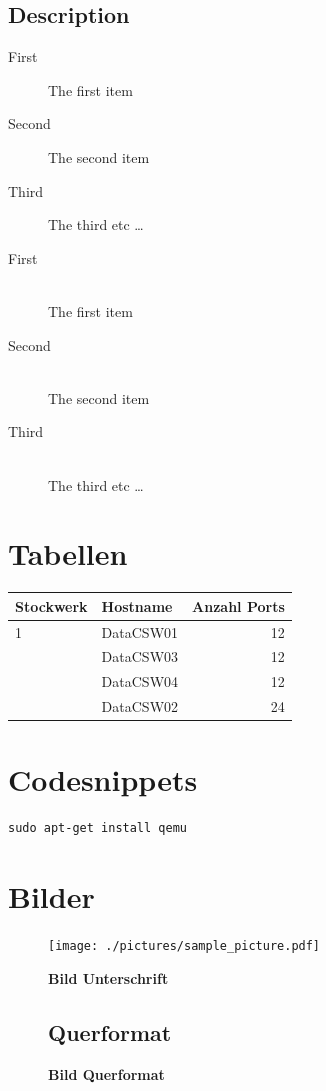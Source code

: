 \documentclass[a4,12pt]{scrartcl}
\begin{document}
\subsection{Description}
\begin{description}
  \item[First] The first item
  \item[Second] The second item
  \item[Third] The third etc \ldots
\end{description}
\begin{description}
  \item[First] \hfill \\
  The first item
  \item[Second] \hfill \\
  The second item
  \item[Third] \hfill \\
  The third etc \ldots
\end{description}

\section{Tabellen}
\begin{center}
    \begin{tabular}{@{} l l r@{}}\toprule    
    {Stockwerk} & {Hostname} & {Anzahl Ports}\\ \midrule
    1 & DataCSW01 & 12\\ \addlinespace
    & DataCSW03 & 12\\ \addlinespace
    & DataCSW04 & 12\\ \addlinespace
    2& DataCSW02 & 24\\
    \bottomrule
    \end{tabular}
\end{center}

\section{Codesnippets}
\begin{lstlisting}
sudo apt-get install qemu
\end{lstlisting}

\section{Bilder}
\begin{figure} [H]
	\begin{center}
	\texttt{[image: ./pictures/sample\_picture.pdf]}
	\caption{\textbf{Bild Unterschrift}}
	\label{Bild Referenz}
	\end{center}
\end{figure}

\begin{landscape}
\begin{figure}[htbp]
\subsection{Querformat}
\centering
{}
\caption{\textbf{Bild Querformat}}
\end{figure}
\end{landscape}	
\end{document}
